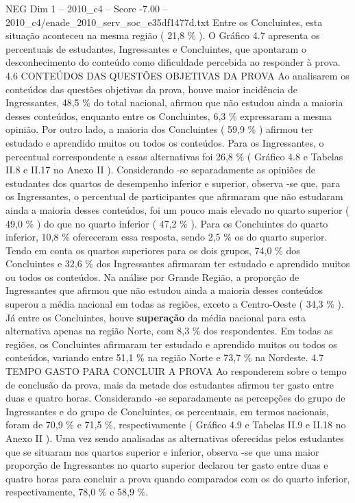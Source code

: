 \begin{textsample}{NEG Dim 1 – 2010\_c4 – Score -7.00 – 2010\_c4/enade\_2010\_serv\_soc\_e35df1477d.txt}
Entre os Concluintes, esta situação aconteceu na mesma região ( 21,8 \% ).
O Gráfico 4.7 apresenta os percentuais de estudantes, Ingressantes e Concluintes, que apontaram o desconhecimento do conteúdo como dificuldade percebida ao responder à prova. 4.6 CONTEÚDOS DAS QUESTÕES OBJETIVAS DA PROVA Ao analisarem os conteúdos das questões objetivas da prova, houve maior incidência de Ingressantes, 48,5 \% do total nacional, afirmou que não estudou ainda a maioria desses conteúdos, enquanto entre os Concluintes, 6,3 \% expressaram a mesma opinião.
Por outro lado, a maioria dos Concluintes ( 59,9 \% ) afirmou ter estudado e aprendido muitos ou todos os conteúdos.
Para os Ingressantes, o percentual correspondente a essas alternativas foi 26,8 \% ( Gráfico 4.8 e Tabelas II.8 e II.17 no Anexo II ).
Considerando -se separadamente as opiniões de estudantes dos quartos de desempenho inferior e superior, observa -se que, para os Ingressantes, o percentual de participantes que afirmaram que não estudaram ainda a maioria desses conteúdos, foi um pouco mais elevado no quarto superior ( 49,0 \% ) do que no quarto inferior ( 47,2 \% ).
Para os Concluintes do quarto inferior, 10,8 \% ofereceram essa resposta, sendo 2,5 \% os do quarto superior.
Tendo em conta os quartos superiores para os dois grupos, 74,0 \% dos Concluintes e 32,6 \% dos Ingressantes afirmaram ter estudado e aprendido muitos ou todos os conteúdos.
Na análise por Grande Região, a proporção de Ingressantes que afirmou que não estudou ainda a maioria desses conteúdos superou a média nacional em todas as regiões, exceto a Centro-Oeste ( 34,3 \% ).
Já entre os Concluintes, houve \textbf{superação} da média nacional para esta alternativa apenas na região Norte, com 8,3 \% dos respondentes.
Em todas as regiões, os Concluintes afirmaram ter estudado e aprendido muitos ou todos os conteúdos, variando entre 51,1 \% na região Norte e 73,7 \% na Nordeste. 4.7 TEMPO GASTO PARA CONCLUIR A PROVA Ao responderem sobre o tempo de conclusão da prova, mais da metade dos estudantes afirmou ter gasto entre duas e quatro horas.
Considerando -se separadamente as percepções do grupo de Ingressantes e do grupo de Concluintes, os percentuais, em termos nacionais, foram de 70,9 \% e 71,5 \%, respectivamente ( Gráfico 4.9 e Tabelas II.9 e II.18 no Anexo II ).
Uma vez sendo analisadas as alternativas oferecidas pelos estudantes que se situaram nos quartos superior e inferior, observa -se que uma maior proporção de Ingressantes no quarto superior declarou ter gasto entre duas e quatro horas para concluir a prova quando comparados com os do quarto inferior, respectivamente, 78,0 \% e 58,9 \%.

\end{textsample}
